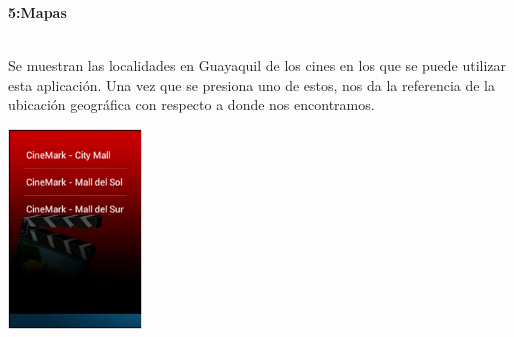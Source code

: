 \documentclass[20pt]{article}
\begin{document}
\begin{large}
\textbf{5:Mapas}\\\
\end{large}
Se muestran las localidades en Guayaquil de los cines en los que se puede utilizar esta aplicación. Una vez que se presiona uno de estos, nos da la referencia de la ubicación geográfica con respecto a donde nos encontramos.
\begin{center}
	\includegraphics[totalheight=1.8in,width=1.4in]{mapas}
\end{center}
\end{document}
